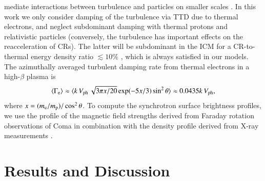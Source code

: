 \documentclass[useAMS,usenatbib]{mn2e}
\newcommand{\Vph}{V_\mathrm{ph}}
\begin{document}
mediate interactions between turbulence and particles on smaller
scales \citep{brunetti11}. In this work we only consider damping of
the turbulence via TTD due to thermal electrons, and neglect
subdominant damping with thermal protons and relativistic particles
(conversely, the turbulence has important effects on the
reacceleration of CRs). The latter will be subdominant in the ICM for
a CR-to-thermal energy density ratio $\lesssim 10 \%$
\citep{brunetti07}, which is always satisfied in our models. The
azimuthally averaged turbulent damping rate from thermal electrons
\citep{brunetti07} in a high-$\beta$ plasma is
\begin{equation}
\label{eq:Gamma_e}
\langle\Gamma_{\rmn{e}}\rangle \approx \langle k\,\Vph\,\sqrt{3\pi
  x/20}\exp(-5x/3)\sin^2{\theta}\rangle\approx 0.0435k\,\Vph, 
\end{equation}
where $x=(m_{{\mathrm{e}}}/m_{{\mathrm{p}}})/\cos^2{\theta}$. To compute the
synchrotron surface brightness profiles, we use the profile of the
magnetic field strengths derived from Faraday rotation observations of
Coma \citep{bonafede10} in combination with the density profile
derived from X-ray measurements \citep{1992A&A...259L..31B}.


\section{Results and Discussion} 
\label{sec:results}
\end{document}
